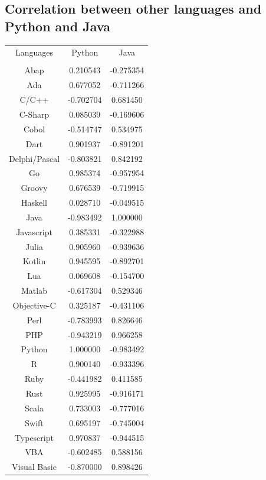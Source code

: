 \documentclass[conference]{IEEEtran}
\begin{document}
\subsection{Correlation between other languages and Python and Java}
\begin{center}
\begin{tabular}{ c c c }
Languages & Python & Java\\\\

Abap & 0.210543 & -0.275354\\
Ada & 0.677052 & -0.711266\\
C/C++ & -0.702704 & 0.681450\\
C-Sharp & 0.085039 & -0.169606\\
Cobol & -0.514747 & 0.534975\\
Dart & 0.901937 & -0.891201\\
Delphi/Pascal & -0.803821 & 0.842192\\
Go & 0.985374 & -0.957954\\
Groovy & 0.676539 & -0.719915\\
Haskell & 0.028710 & -0.049515\\
Java & -0.983492 & 1.000000\\
Javascript & 0.385331 & -0.322988\\
Julia & 0.905960 & -0.939636\\
Kotlin & 0.945595 & -0.892701\\
Lua & 0.069608 & -0.154700\\
Matlab & -0.617304 & 0.529346\\
Objective-C & 0.325187 & -0.431106\\
Perl & -0.783993 & 0.826646\\
PHP & -0.943219 & 0.966258\\
Python & 1.000000 & -0.983492\\
R & 0.900140 & -0.933396\\
Ruby & -0.441982 & 0.411585\\
Rust & 0.925995 & -0.916171\\
Scala & 0.733003 & -0.777016\\
Swift & 0.695197 & -0.745004\\
Typescript & 0.970837 & -0.944515\\
VBA & -0.602485 & 0.588156\\
Visual Basic & -0.870000 & 0.898426\\

\end{tabular}
\end{center}
\end{document}
